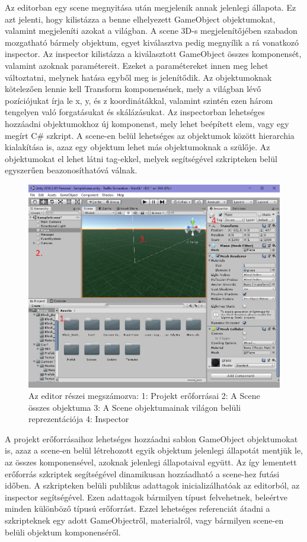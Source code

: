 Az editorban egy scene megnyitása után megjelenik annak jelenlegi állapota. Ez azt jelenti, hogy kilistázza a benne elhelyezett GameObject objektumokat, valamint megjeleníti azokat a világban. A scene 3D-s megjelenítőjében szabadon mozgatható bármely objektum, egyet kiválasztva pedig megnyílik a rá vonatkozó inspector. Az inspector kilistázza a kiválasztott GameObject összes komponensét, valamint azoknak paramétereit. Ezeket a paramétereket innen meg lehet változtatni, melynek hatása egyből meg is jelenítődik. Az objektumoknak kötelezően lennie kell Transform komponensének, mely a világban lévő pozíciójukat írja le x, y, és z koordinátákkal, valamint szintén ezen három tengelyen való forgatásukat és skálázásukat.
Az inspectorban lehetséges hozzáadni objektumokhoz új komponenst, mely lehet beépített elem, vagy egy megírt C\# szkript. A scene-en belül lehetséges az objektumok között hierarchia kialakítása is, azaz egy objektum lehet más objektumoknak a szülője.
Az objektumokat el lehet látni tag-ekkel, melyek segítségével szkripteken belül egyszerűen beazonosíthatóvá válnak.
\begin{figure}[H]
\includegraphics[width=\linewidth]{editor.png}
\caption{Az editor részei megszámozva: 1: Projekt erőforrásai 2: A Scene összes objektuma 3: A Scene objektumainak világon belüli reprezentációja 4: Inspector}
\label{fig:ed}
\end{figure}
A projekt erőforrásaihoz lehetséges hozzáadni sablon GameObject objektumokat is, azaz a scene-en belül létrehozott egyik objektum jelenlegi állapotát mentjük le, az összes komponensével, azoknak jelenlegi állapotaival együtt. Az így lementett erőforrás szkriptek segítségével dinamikusan hozzáadható a scene-hez futási időben. A szkripteken belüli publikus adattagok inicializálhatóak az editorból, az inspector segítségével. Ezen adattagok bármilyen típust felvehetnek, beleértve minden különböző típusú erőforrást.
Ezzel lehetséges referenciát átadni a szkripteknek egy adott GameObjectről, materialról, vagy bármilyen scene-en belüli objektum komponenséről.
